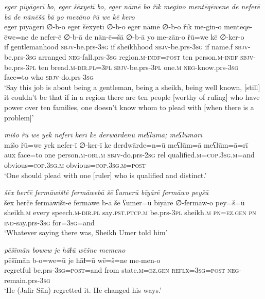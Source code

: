 \ea \label{ŠJ.91}
\textit{eger pīyāgerī bo, eger šēxyetī bo, eger nāmē bo řīk megino mentēqēwene de neferē bā de nānēšā bā yo mezāno řū we kē kero} \\ 
\gll eger pīyāgerī ∅-b-o eger šēxyetī ∅-b-o eger nāmē ∅-b-o řīk me-gin-o mentēqe-ēwe=ne de nefer-ē ∅-b-ā de nān-ē=šā ∅-b-ā yo me-zān-o řū=we kē ∅-ker-o \\ 
 if gentlemanhood \textsc{sbjv-}be.prs\textsc{-3sg} if sheikhhood \textsc{sbjv-}be.prs\textsc{-3sg} if name.f \textsc{sbjv-}be.prs\textsc{-3sg} arranged \textsc{neg-}fall.prs\textsc{-3sg} region\textsc{.m}\textsc{-indf}\textsc{=\textsc{post}} ten person\textsc{.m}\textsc{-indf} \textsc{sbjv-}be.prs\textsc{-3pl} ten bread\textsc{.m}\textsc{-dir}\textsc{.pl}\textsc{=3pl} \textsc{sbjv-}be.prs\textsc{-3pl} one\textsc{.m} \textsc{neg-}know.prs\textsc{-3sg} face=to who \textsc{sbjv-}do.prs\textsc{-3sg} \\ 
\glt `Say this job is about being a gentleman, being a sheikh, being well known, [still] it couldn’t be that if in a region there are ten people [worthy of ruling] who have power over ten families, one doesn’t know whom to plead with [when there is a problem]'
\z 
 
\ea \label{ŠJ.92}
\textit{mišo řū we yek neferī kerī ke derwārdenū meʕlūmā; meʕlūmārī} \\ 
\gll mišo řū=we yek nefer-ī ∅-ker-ī ke derđwārde=n=ū meʕlūm=ā meʕlūm=ā=rī \\ 
 aux face=to one person\textsc{.m}\textsc{-obl}\textsc{.m} \textsc{sbjv-}do.prs-\textsc{2sg} rel qualified\textsc{.m}\textsc{=cop}\textsc{.3sg}\textsc{.m}=and obvious\textsc{=cop}\textsc{.3sg}\textsc{.m} obvious\textsc{=cop}\textsc{.3sg}\textsc{.m}\textsc{=\textsc{post}} \\ 
\glt `One should plead with one [ruler] who is qualified and distinct.'
\z 
 
\ea \label{ŠJ.94}
\textit{šēx herčē fermāwištē fermāwebā šē ʕumerū bīyārē fermāwo peyšū} \\ 
\gll šēx herčē fermāwišt-ē fermāwe b-ā šē ʕumer=ū bīyārē ∅-fermāw-o pey=š=ū \\ 
 sheikh\textsc{.m} every speech\textsc{.m}\textsc{-dir}\textsc{.pl} say\textsc{.pst}\textsc{.ptcp}\textsc{.m} be.prs\textsc{-3pl} sheikh\textsc{.m} \textsc{pn}\textsc{=ez.gen} \textsc{pn} \textsc{ind-}say.prs\textsc{-3sg} for\textsc{=3sg}=and \\ 
\glt `Whatever saying there was, Sheikh Umer told him'
\z 
 
\ea \label{ŠJ.95}
\textit{pēšīmān bowew je hāɫū wēšne memeno} \\ 
\gll pēšīmān b-o=we=ū je hāɫ=ū wē=š=ne me-men-o \\ 
 regretful be.prs\textsc{-3sg}\textsc{=\textsc{post}}=and from state\textsc{.m}\textsc{=ez.gen} \textsc{reflx}\textsc{=3sg}\textsc{=\textsc{post}} \textsc{neg-}remain.prs\textsc{-3sg} \\ 
\glt `He (Jafir Sān) regretted it. He changed his ways.'
\z 
 
